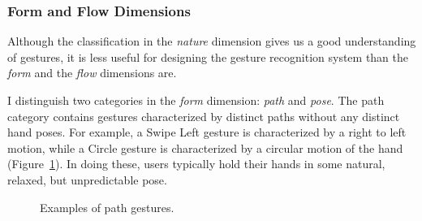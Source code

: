 \subsubsection{Form and Flow Dimensions}
Although the classification in the \textit{nature} dimension gives us a good
understanding of gestures, it is less useful for designing the gesture
recognition system than the \textit{form} and the \textit{flow} dimensions are.


I distinguish two
categories in the \textit{form} dimension: \textit{path} and \textit{pose}. The
path category contains gestures characterized by distinct paths without any distinct
hand poses. For example, a Swipe Left gesture is characterized by a
right to left motion, while a Circle gesture is characterized by a
circular motion of the hand (Figure~\ref{fig:path-gestures}). In doing these,
users typically hold their hands in some natural, relaxed, but unpredictable pose. 

\begin{figure}[tbh]
\centering
{}
\caption{Examples of path gestures.}
\label{fig:path-gestures}
\end{figure}

